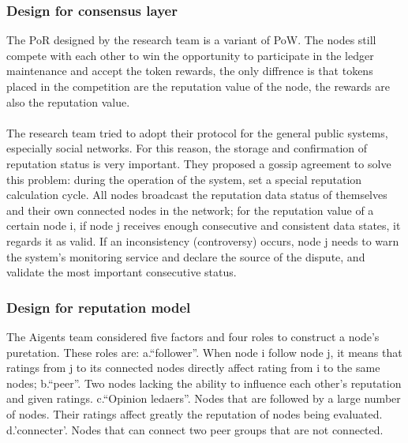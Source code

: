 \documentclass[doublespacing]{bmcart}
\begin{document}
\begin{CJK*}{UTF8}{gbsn}
	\subsubsection*{Design for consensus layer}  
	The PoR designed by the research team is a variant of PoW. The nodes still compete with each other to win the opportunity to participate in the ledger maintenance and accept the token rewards, the only diffrence is that tokens placed in the competition are the reputation value of the node, the rewards are also the reputation value.
	\paragraph{}
	The research team tried to adopt their protocol for the general public systems, especially social networks. For this reason, the storage and confirmation of reputation status is very important. They proposed a gossip agreement to solve this problem: during the operation of the system, set a special reputation calculation cycle. All nodes broadcast the reputation data status of themselves and their own connected nodes in the network; for the reputation value of a certain node i, if node j receives enough consecutive and consistent data states, it regards it as valid. If an inconsistency (controversy) occurs, node j needs to warn the system's monitoring service and declare the source of the dispute, and validate the most important consecutive status.
	\subsubsection*{Design for reputation model}
	The Aigents team considered five factors and four roles to construct a node's puretation. These roles are: a.``follower''. When node i follow node j, it means that ratings from j to its connected nodes directly affect rating from i to the same nodes; b.``peer''. Two nodes lacking the ability to influence each other's reputation and given ratings. c.``Opinion ledaers''. Nodes that are followed by a large number of nodes. Their ratings affect greatly the reputation of nodes being evaluated. d.'connecter'. Nodes that can connect two peer groups that are not connected.

\end{CJK*}
\end{document}
